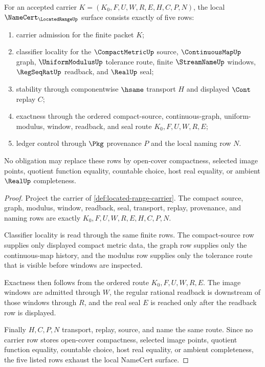 \begin{theorem}
\label{thm:located-range-namecert-obligations}
For an accepted carrier $K=(K_0,F,U,W,R,E,H,C,P,N)$, the local $\NameCert_{\LocatedRangeUp}$ surface consists exactly of five rows:
\begin{enumerate}
\item carrier admission for the finite packet $K$;
\item classifier locality for the $\CompactMetricUp$ source, $\ContinuousMapUp$ graph, $\UniformModulusUp$ tolerance route, finite $\StreamNameUp$ windows, $\RegSeqRatUp$ readback, and $\RealUp$ seal;
\item stability through componentwise $\hsame$ transport $H$ and displayed $\Cont$ replay $C$;
\item exactness through the ordered compact-source, continuous-graph, uniform-modulus, window, readback, and seal route $K_0,F,U,W,R,E$;
\item ledger control through $\Pkg$ provenance $P$ and the local naming row $N$.
\end{enumerate}
No obligation may replace these rows by open-cover compactness, selected image points, quotient function equality, countable choice, host real equality, or ambient $\RealUp$ completeness.
\end{theorem}
\begin{proof}
Project the carrier of \autoref{def:located-range-carrier}. The compact source, graph, modulus, window, readback, seal, transport, replay, provenance, and naming rows are exactly $K_0,F,U,W,R,E,H,C,P,N$.

Classifier locality is read through the same finite rows. The compact-source row supplies only displayed compact metric data, the graph row supplies only the continuous-map history, and the modulus row supplies only the tolerance route that is visible before windows are inspected.

Exactness then follows from the ordered route $K_0,F,U,W,R,E$. The image windows are admitted through $W$, the regular rational readback is downstream of those windows through $R$, and the real seal $E$ is reached only after the readback row is displayed.

Finally $H,C,P,N$ transport, replay, source, and name the same route. Since no carrier row stores open-cover compactness, selected image points, quotient function equality, countable choice, host real equality, or ambient completeness, the five listed rows exhaust the local NameCert surface.
\end{proof}

